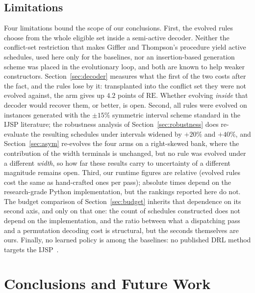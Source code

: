 \documentclass[review,authoryear,11pt]{elsarticle}
\newcommand{\rev}[1]{\textcolor{revcolor}{#1}}
\newcommand{\RE}{\mathrm{RE}}
\begin{document}
\subsection{Limitations}
\label{sec:limitations}
Four limitations bound the scope of our conclusions. First, the evolved
rules choose from the whole eligible set inside a semi-active decoder.
Neither the conflict-set restriction that makes Giffler and Thompson's
procedure yield active schedules, used here only for the baselines, nor
an insertion-based generation scheme was placed in the evolutionary loop,
and both are known to help weaker constructors. \rev{Section~\ref{sec:decoder}
measures what the first of the two costs after the fact, and the rules
lose by it: transplanted into the conflict set they were not evolved
against, the arm gives up $4.2$ points of $\RE$. Whether evolving
\emph{inside} that decoder would recover them, or better, is open.}
Second, all rules were
evolved on instances generated with the $\pm15\%$ symmetric interval
scheme standard in the IJSP literature; the robustness analysis of
Section~\ref{sec:robustness} does re-evaluate the resulting schedules
under intervals widened by $+20\%$ and $+40\%$, \rev{and
Section~\ref{sec:asym} re-evolves the four arms on a right-skewed bank,
where the contribution of the width terminals is unchanged,}
but no rule was evolved
under a different \emph{width}\rev{, so how far these results carry to
uncertainty of a different magnitude remains open}.
Third, our runtime figures
are relative (evolved rules cost the same as hand-crafted ones per
pass); absolute times depend on the research-grade Python
implementation, but the rankings reported here do not. \rev{The
budget comparison of Section~\ref{sec:budget} inherits that dependence
on its second axis, and only on that one: the count of schedules
constructed does not depend on the implementation, and the ratio
between what a dispatching pass and a permutation decoding cost is
structural, but the seconds themselves are ours.} Finally, no
learned policy is among the baselines: no published DRL method targets
the IJSP~\citep{Xu2025}.

\section{Conclusions and Future Work}
\label{sec:conclusions}
\end{document}
